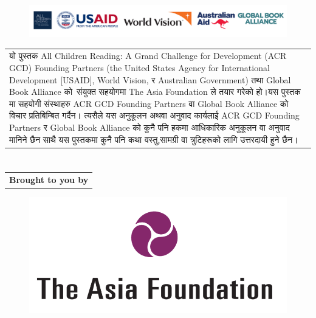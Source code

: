 \documentclass[
  letterpaper,
  DIV=11,
  numbers=noendperiod,
  paper=6in:9in,
  pagesize=pdftex,
  headinclude=on,
  footinclude=on,
  12pt]{scrreprt}
\begin{document}
\hypertarget{img}{}
\begin{figure}[H]

{\centering \includegraphics{images/p-9.jpg}

}

\end{figure}

\hypertarget{p}{}
\begin{longtable}[]{@{}
  >{\raggedright\arraybackslash}p{}@{}}
\toprule\noalign{}
\endhead
\bottomrule\noalign{}
\endlastfoot
यो पुस्तक All Children Reading: A Grand Challenge for Development (ACR
GCD) Founding Partners (the United States Agency for International
Development {[}USAID{]}, World Vision, र Australian Government) तथा
Global Book Alliance को\, संयुक्त सहयोगमा The Asia Foundation ले तयार गरेको
हो।यस पुस्तक मा सहयोगी संस्थाहरु ACR GCD Founding Partners वा Global Book
Alliance को\, विचार प्रतिबिम्बित गर्दैन। त्यसैले यस अनुकूलन अथवा अनुवाद कार्यलाई
ACR GCD Founding Partners र Global Book Alliance को कुनै पनि हकमा आधिकारिक
अनुकूलन वा अनुवाद मानिने छैन साथै यस पुस्तकमा कुनै पनि कथा वस्तु,सामग्री वा त्रुटिहरूको
लागि उत्तरदायी हुने छैन। \\
\end{longtable}


\hypertarget{section-8}{%
\chapter{}\label{section-8}}

\hypertarget{CopyrightHead}{}
\begin{longtable}[]{@{}c@{}}
\toprule\noalign{}
\endhead
\bottomrule\noalign{}
\endlastfoot
\textbf{Brought to you by} \\
\end{longtable}

\begin{figure}[H]

{\centering \includegraphics{images/aflogo.png}

}

\end{figure}
\end{document}
